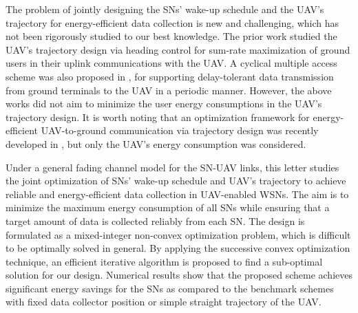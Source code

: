 \documentclass[journal]{IEEEtran}
\begin{document}
The problem of jointly designing the SNs' wake-up schedule and the UAV's trajectory for energy-efficient data collection is new and challenging, which has not been rigorously studied to our best knowledge. The prior work \cite{FJiang} studied the
UAV's trajectory design via heading control for sum-rate maximization of ground users in their uplink communications with the UAV. A cyclical multiple access scheme was also proposed in \cite{JLyu}, for supporting delay-tolerant data transmission from ground terminals to the UAV in a periodic manner. However, the above works did not aim to minimize the user energy consumptions in the UAV's trajectory design. It is worth noting that an optimization framework for energy-efficient UAV-to-ground communication via trajectory design was recently developed in \cite{YZeng}, but only the UAV's energy consumption was considered.

Under a general fading channel model for the SN-UAV links, this letter studies the joint optimization of SNs' wake-up schedule and UAV's trajectory to achieve reliable and energy-efficient data collection in UAV-enabled WSNs. The aim is to minimize the maximum energy consumption of all SNs while ensuring that a target amount of data is collected reliably from each SN. The design is formulated as a mixed-integer non-convex optimization problem, which is difficult to be optimally solved in general. By applying the successive convex optimization
technique, an efficient iterative algorithm is proposed to find a sub-optimal solution for our design. Numerical results show that the proposed scheme achieves significant energy savings for the SNs  as compared to the benchmark schemes with fixed data collector position or simple straight trajectory of the UAV.\vspace{-0.1in}
\end{document}
